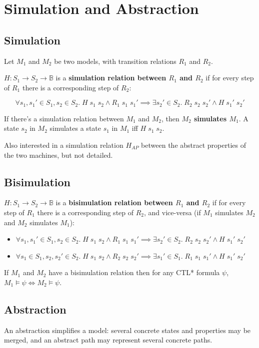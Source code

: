 \documentclass[a4paper, 11pt]{article}
\begin{document}
\section*{Simulation and Abstraction}
{
    \subsection*{Simulation}
    {
        Let \(M_1\) and \(M_2\) be two models, with transition relations \(R_1\) and \(R_2\).

        \(H : S_1 \rightarrow S_2 \rightarrow \mathbb{B}\) is a \textbf{simulation relation between \(R_1\) and \(R_2\)} if for every step of \(R_1\) there is a corresponding step of \(R_2\):

        \[\forall s_1,s_1' \in S_1, s_2 \in S_2.\; H\;s_1\;s_2 \wedge R_1\;s_1\;s_1' \implies \exists s_2' \in S_2.\;R_2\;s_2\;s_2' \wedge H\;s_1'\;s_2'\]

        If there's a simulation relation between \(M_1\) and \(M_2\), then \textbf{\(M_2\) simulates \(M_1\)}. A state \(s_2\) in \(M_2\) simulates a state \(s_1\) in \(M_1\) iff \(H\;s_1\;s_2\).

        Also interested in a simulation relation \(H_{AP}\) between the abstract properties of the two machines, but not detailed.
    }
    \subsection*{Bisimulation}
    {
        \(H : S_1 \rightarrow S_2 \rightarrow \mathbb{B}\) is a \textbf{bisimulation relation between \(R_1\) and \(R_2\)} if for every step of \(R_1\) there is a corresponding step of \(R_2\), and vice-versa (if \(M_1\) simulates \(M_2\) and \(M_2\) simulates \(M_1\)):

        \begin{itemize}
        \item \(\forall s_1,s_1' \in S_1, s_2 \in S_2.\; H\;s_1\;s_2 \wedge R_1\;s_1\;s_1' \implies \exists s_2' \in S_2.\;R_2\;s_2\;s_2' \wedge H\;s_1'\;s_2'\)
        \item \(\forall s_1 \in S_1, s_2,s_2' \in S_2.\; H\;s_1\;s_2 \wedge R_2\;s_2\;s_2' \implies \exists s_1' \in S_1.\;R_1\;s_1\;s_1' \wedge H\;s_1'\;s_2'\)
        \end{itemize}

        If \(M_1\) and \(M_2\) have a bisimulation relation then for any CTL* formula \(\psi\), \(M_1\vDash\psi \Longleftrightarrow M_2\vDash\psi\).
    }
    \subsection*{Abstraction}
    {
        An abstraction simplifies a model: several concrete states and properties may be merged, and an abstract path may represent several concrete paths.

}}
\end{document}
